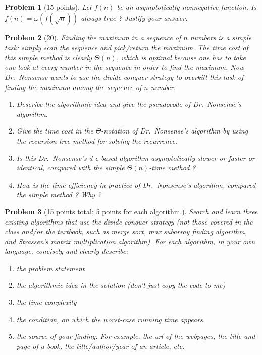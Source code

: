 \documentclass[11pt]{article}
\newtheorem{problem}{Problem}
\begin{document}
\begin{problem}[15 points]
\label{prob:5}
Let $f(n)$ be an asymptotically nonnegative function.
Is $f(n)=\omega(f(\sqrt{n}))$ always true ? Justify your answer. 
\end{problem}



\begin{problem}[20]
\label{prob:6}
  Finding the maximum in a sequence of $n$ numbers is a simple task:
  simply scan the sequence and pick/return the maximum. The time cost
  of this simple method is clearly $\Theta(n)$, which is optimal
  because one has to take one look at every number in the sequence in
  order to find the maximum.
  Now Dr.\ Nonsense wants to use the divide-conquer strategy to
  overkill this task of finding the maximum among the sequence of $n$
  number.  
\begin{enumerate}
\item 
Describe the algorithmic idea and give the pseudocode of Dr.\
Nonsense's algorithm.
\item Give the time cost in the $\Theta$-notation of Dr.\ Nonsense's
  algorithm by using the recursion tree method for solving the
  recurrence. 
\item Is this Dr.\ Nonsense's d-c based algorithm asymptotically slower
  or faster or identical, compared with the simple $\Theta(n)$-time
  method ? 
\item How is the time efficiency in practice of Dr.\ Nonsense's
  algorithm, compared the simple method ? Why ? 
\end{enumerate}
 
\end{problem}





\begin{problem}[15 points total; 5 points for each algorithm.]
\label{prob:7}
 Search and learn three existing algorithms that use the
  divide-conquer strategy (not those covered in the class and/or the
  textbook, such as merge sort, max subarray finding algorithm, and
  Strassen's matrix multiplication algorithm). For each algorithm, in
  your own language, concisely and clearly describe:

\begin{enumerate}
\item  the problem statement

\item  the algorithmic idea in the solution (don't just copy the code to me)

\item the time complexity

\item the condition, on which the worst-case running time appears. 

\item the source of your finding. For example, the url of the webpages, the 
title and page of a book, the title/author/year of an article, etc. 
\end{enumerate}
\end{problem}
\end{document}
